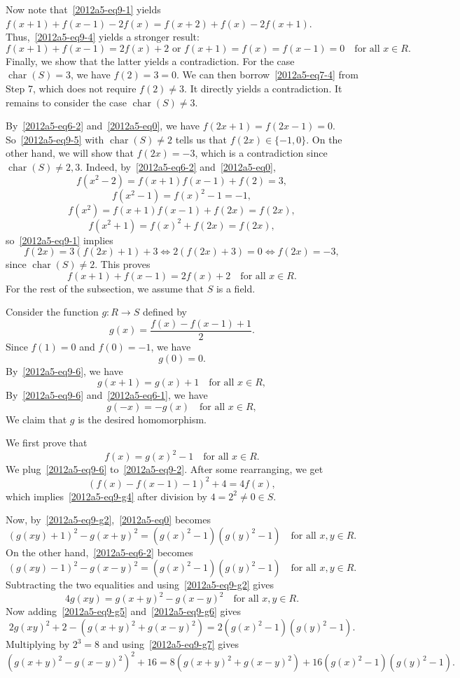 \documentclass{article}
\DeclareMathOperator{\rchar}{char}
\begin{document}
Now note that~\eqref{2012a5-eq9-1} yields $f(x + 1) + f(x - 1) - 2 f(x) = f(x + 2) + f(x) - 2 f(x + 1)$.
Thus,~\eqref{2012a5-eq9-4} yields a stronger result:
\[ f(x + 1) + f(x - 1) = 2 f(x) + 2 \text{ or } f(x + 1) = f(x) = f(x - 1) = 0 \quad \text{for all } x \in R. \tag{9.5}\label{2012a5-eq9-5} \]
Finally, we show that the latter yields a contradiction.
For the case $\rchar(S) = 3$, we have $f(2) = 3 = 0$.
We can then borrow~\eqref{2012a5-eq7-4} from Step 7, which does not require $f(2) \neq 3$.
It directly yields a contradiction.
It remains to consider the case $\rchar(S) \neq 3$.

By~\eqref{2012a5-eq6-2} and~\eqref{2012a5-eq0}, we have $f(2x + 1) = f(2x - 1) = 0$.
So~\eqref{2012a5-eq9-5} with $\rchar(S) \neq 2$ tells us that $f(2x) \in \{-1, 0\}$.
On the other hand, we will show that $f(2x) = -3$, which is a contradiction since $\rchar(S) \neq 2, 3$.
Indeed, by~\eqref{2012a5-eq6-2} and~\eqref{2012a5-eq0},
\[ f(x^2 - 2) = f(x + 1) f(x - 1) + f(2) = 3, \]
\[ f(x^2 - 1) = f(x)^2 - 1 = -1, \]
\[ f(x^2) = f(x + 1) f(x - 1) + f(2x) = f(2x), \]
\[ f(x^2 + 1) = f(x)^2 + f(2x) = f(2x), \]
    so~\eqref{2012a5-eq9-1} implies
\[ f(2x) = 3 (f(2x) + 1) + 3 \iff 2 (f(2x) + 3) = 0 \iff f(2x) = -3, \]
    since $\rchar(S) \neq 2$.
This proves
\[ f(x + 1) + f(x - 1) = 2 f(x) + 2 \quad \text{for all } x \in R. \tag{9.6}\label{2012a5-eq9-6} \]
For the rest of the subsection, we assume that $S$ is a field.

Consider the function $g : R \to S$ defined by
\[ g(x) = \frac{f(x) - f(x - 1) + 1}{2}. \]
Since $f(1) = 0$ and $f(0) = -1$, we have
\[ g(0) = 0. \tag{9.g1}\label{2012a5-eq9-g1} \]
By~\eqref{2012a5-eq9-6}, we have
\[ g(x + 1) = g(x) + 1 \quad \text{for all } x \in R, \tag{9.g2}\label{2012a5-eq9-g2} \]
By~\eqref{2012a5-eq9-6} and~\eqref{2012a5-eq6-1}, we have
\[ g(-x) = -g(x) \quad \text{for all } x \in R, \tag{9.g3}\label{2012a5-eq9-g3} \]
We claim that $g$ is the desired homomorphism.

We first prove that
\[ f(x) = g(x)^2 - 1 \quad \text{for all } x \in R. \tag{9.g4}\label{2012a5-eq9-g4} \]
We plug~\eqref{2012a5-eq9-6} to~\eqref{2012a5-eq9-2}.
After some rearranging, we get
\[ (f(x) - f(x - 1) - 1)^2 + 4 = 4 f(x), \]
    which implies~\eqref{2012a5-eq9-g4} after division by $4 = 2^2 \neq 0 \in S$.

Now, by~\eqref{2012a5-eq9-g2},~\eqref{2012a5-eq0} becomes
\[ (g(xy) + 1)^2 - g(x + y)^2 = (g(x)^2 - 1)(g(y)^2 - 1) \quad \text{for all } x, y \in R. \tag{9.g5}\label{2012a5-eq9-g5} \]
On the other hand,~\eqref{2012a5-eq6-2} becomes
\[ (g(xy) - 1)^2 - g(x - y)^2 = (g(x)^2 - 1)(g(y)^2 - 1) \quad \text{for all } x, y \in R. \tag{9.g6}\label{2012a5-eq9-g6} \]
Subtracting the two equalities and using~\eqref{2012a5-eq9-g2} gives
\[ 4 g(xy) = g(x + y)^2 - g(x - y)^2 \quad \text{for all } x, y \in R. \tag{9.g7}\label{2012a5-eq9-g7} \]
Now adding~\eqref{2012a5-eq9-g5} and~\eqref{2012a5-eq9-g6} gives
\[ 2 g(xy)^2 + 2 - (g(x + y)^2 + g(x - y)^2) = 2 (g(x)^2 - 1)(g(y)^2 - 1). \]
Multiplying by $2^3 = 8$ and using~\eqref{2012a5-eq9-g7} gives
\[ (g(x + y)^2 - g(x - y)^2)^2 + 16 = 8(g(x + y)^2 + g(x - y)^2) + 16 (g(x)^2 - 1)(g(y)^2 - 1). \tag{9.g8}\label{2012a5-eq9-g8} \]
\end{document}
